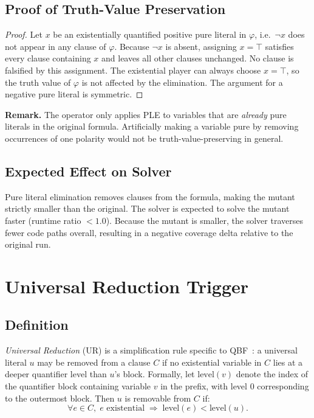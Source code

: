 \subsection{Proof of Truth-Value Preservation}

\begin{proof}
Let $x$ be an existentially quantified positive pure literal in $\varphi$, i.e.\ $\lnot x$ does not appear in any clause of $\varphi$.
Because $\lnot x$ is absent, assigning $x = \top$ satisfies every clause containing $x$ and leaves all other clauses unchanged. No clause is falsified by this assignment. The existential player can always choose $x = \top$, so the truth value of $\varphi$ is not affected by the elimination.
The argument for a negative pure literal is symmetric.
\end{proof}

\textbf{Remark.} The operator only applies PLE to variables that are \emph{already} pure literals in the original formula. Artificially making a variable pure by removing occurrences of one polarity would not be truth-value-preserving in general.

\subsection{Expected Effect on Solver}

Pure literal elimination removes clauses from the formula, making the 
mutant strictly smaller than the original. The solver is expected to 
solve the mutant faster (runtime ratio $< 1.0$). Because the mutant 
is smaller, the solver traverses fewer code paths overall, resulting 
in a negative coverage delta relative to the original run.

\section{Universal Reduction Trigger}\label{sec:ur}

\subsection{Definition}
\emph{Universal Reduction} (UR) is a simplification rule specific to QBF~\cite{KleineBuening1995}: a universal literal $u$ may be removed from a clause $C$ if no existential variable in $C$ lies at a deeper quantifier level than $u$'s block. Formally, let $\mathrm{level}(v)$ denote the index of the quantifier block containing variable $v$ in the prefix, with level $0$ corresponding to the outermost block. Then $u$ is removable from $C$ if:
\[
  \forall e \in C,\; e \text{ existential} \;\Rightarrow\; \mathrm{level}(e) < \mathrm{level}(u).
\]

